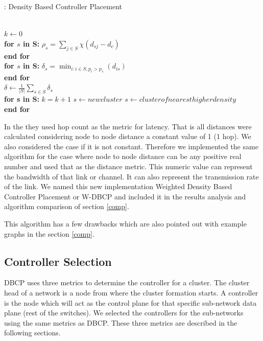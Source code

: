 \documentclass[10pt]{extarticle}
\begin{document}
	\begin{algorithm}
		\caption{: Density Based Controller Placement}\label{euclid}
		\begin{algorithmic}[1]
			 \\
			$k \gets 0$ \\
			\textbf{for $s$ in S:}
			\State $\rho_s=\sum_{j\in S}\chi(d_{sj}-d_c)$ \\
			\textbf{end for} \\
			\textbf{for $s$ in S:}
			\State $\delta_s=\min_{i:i\in S,p_i>p_s}(d_{is})$ \\
			\textbf{end for} \\
			$\delta \gets \frac{1}{|S|}\sum_{s\in S}\delta_s$ \\
			\textbf{for s in S:}
			\State $k = k + 1$
			\State $s \gets newcluster$
			\Else
			\State $s \gets cluster of nearest higher density$
			\EndIf \\
			\textbf{end for}
			\EndProcedure
		\end{algorithmic}
	\end{algorithm}
	
	In the \cite{dbcp} they used hop count as the metric for latency. That is all distances were calculated considering node to node distance a constant value of 1 (1 hop). We also considered the case if it is not constant. Therefore we implemented the same algorithm for the case where node to node distance can be any positive real number and used that as the distance metric. This numeric value can represent the bandwidth of that link or channel. It can also represent the transmission rate of the link. We named this new implementation Weighted Density Based Controller Placement or W-DBCP and included it in the results analysis and algorithm comparison of section \ref{comp}.
	
	This algorithm has a few drawbacks which are also pointed out with example graphs in the section \ref{comp}.
	
	\subsection{Controller Selection} \label{dbcp:consel}
	DBCP uses three metrics to determine the controller for a cluster. The cluster head of a network is a node from where the cluster formation starts. A controller is the node which will act as the control plane for that specific sub-network data plane (rest of the switches). We selected the controllers for the sub-networks using the same metrics as DBCP. These three metrics are described in the following sections.
	
\end{document}
